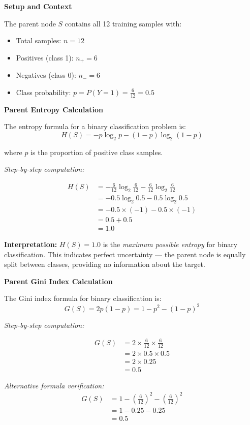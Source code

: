 \documentclass[12pt]{article}
\begin{document}
\begin{solution}
\textbf{Setup and Context}

The parent node $S$ contains all 12 training samples with:
\begin{itemize}
    \item Total samples: $n = 12$
    \item Positives (class 1): $n_+ = 6$
    \item Negatives (class 0): $n_- = 6$
    \item Class probability: $p = P(Y=1) = \frac{6}{12} = 0.5$
\end{itemize}

\textbf{Parent Entropy Calculation}

The entropy formula for a binary classification problem is:
\[
H(S) = -p \log_2 p - (1-p) \log_2(1-p)
\]

where $p$ is the proportion of positive class samples.

\textit{Step-by-step computation:}

\begin{align*}
H(S) &= -\frac{6}{12} \log_2 \frac{6}{12} - \frac{6}{12} \log_2 \frac{6}{12} \\
&= -0.5 \log_2 0.5 - 0.5 \log_2 0.5 \\
&= -0.5 \times (-1) - 0.5 \times (-1) \\
&= 0.5 + 0.5 \\
&= 1.0
\end{align*}

\textbf{Interpretation:} $H(S) = 1.0$ is the \textit{maximum possible entropy} for binary classification. This indicates perfect uncertainty — the parent node is equally split between classes, providing no information about the target.

\textbf{Parent Gini Index Calculation}

The Gini index formula for binary classification is:
\[
G(S) = 2p(1-p) = 1 - p^2 - (1-p)^2
\]

\textit{Step-by-step computation:}

\begin{align*}
G(S) &= 2 \times \frac{6}{12} \times \frac{6}{12} \\
&= 2 \times 0.5 \times 0.5 \\
&= 2 \times 0.25 \\
&= 0.5
\end{align*}

\textit{Alternative formula verification:}
\begin{align*}
G(S) &= 1 - \left(\frac{6}{12}\right)^2 - \left(\frac{6}{12}\right)^2 \\
&= 1 - 0.25 - 0.25 \\
&= 0.5
\end{align*}


\end{solution}
\end{document}
